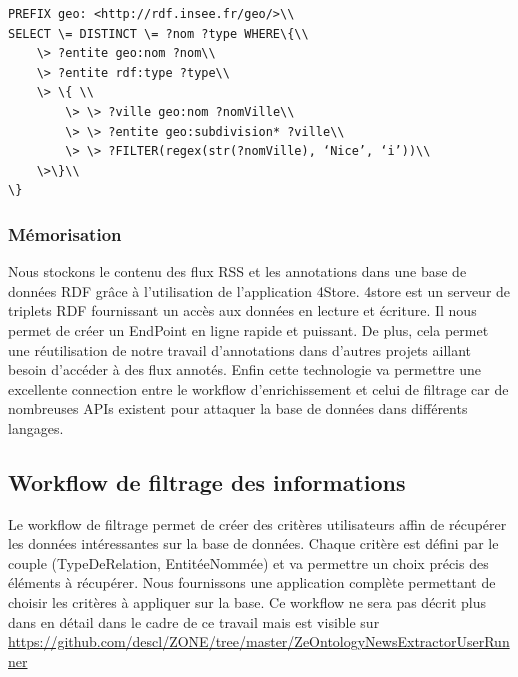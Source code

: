 \documentclass[]{easychair}
\newcommand{\comment}[4]{\par\noindent\hspace*{-0.5cm}{\parbox{\columnwidth}{\textbf{\color{#1}//#2[#3]:#4}}}\par}
\newcommand{\mi}[1]{\comment{blue}{}{#1}{MI}}
\begin{document}
\begin{itemize}
\begin{itemize}
\begin{verbatim}
PREFIX geo: <http://rdf.insee.fr/geo/>\\
SELECT \= DISTINCT \= ?nom ?type WHERE\{\\
	\> ?entite geo:nom ?nom\\
	\> ?entite rdf:type ?type\\
	\> \{ \\
		\> \> ?ville geo:nom ?nomVille\\
		\> \> ?entite geo:subdivision* ?ville\\
		\> \> ?FILTER(regex(str(?nomVille), ‘Nice’, ‘i’))\\
	\>\}\\
\}
\end{verbatim}
\end{itemize}
\end{itemize}


\subsubsection{Mémorisation}
\mi{je ne sens pas cette partie.. à voir}
Nous stockons le contenu des flux RSS et les annotations dans une base de données RDF grâce à l'utilisation de l'application 4Store. 4store est un serveur de triplets RDF fournissant un accès aux données en lecture et écriture. Il nous permet de créer un EndPoint en ligne rapide et puissant. De plus, cela permet une réutilisation de notre travail d'annotations dans d'autres projets aillant besoin d'accéder à des flux annotés. Enfin cette technologie va permettre une excellente connection entre le workflow d'enrichissement et celui de filtrage car de nombreuses APIs existent pour attaquer la base de données dans différents langages.

\subsection{Workflow de filtrage des informations}
Le workflow de filtrage permet de créer des critères utilisateurs affin de récupérer les données intéressantes sur la base de données. Chaque critère est défini par le couple (TypeDeRelation, EntitéeNommée) et va permettre un choix précis des éléments à récupérer. Nous fournissons une application complète permettant de choisir les critères à appliquer sur la base. Ce workflow ne sera pas décrit plus dans en détail dans le cadre de ce travail mais est visible sur \url{https://github.com/descl/ZONE/tree/master/ZeOntologyNewsExtractorUserRunner}
\end{document}
